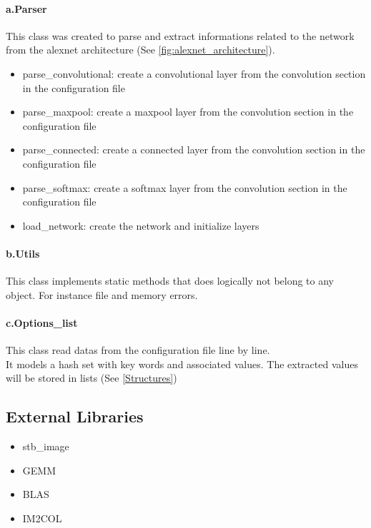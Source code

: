 \documentclass[parskip=full]{scrartcl}
\newcommand\tab[1][1cm]{\hspace*{#1}}
\begin{document}
		\paragraph{a.Parser} \label{Parser}
		\tab This class was created to parse and extract informations related to the network from the alexnet architecture (See \ref{fig:alexnet_architecture}).
		\begin{itemize}
			\item parse\_convolutional: create a convolutional layer from the convolution section in the configuration file
			\item parse\_maxpool: create a maxpool layer from the convolution section in the configuration file
			\item parse\_connected: create a connected layer from the convolution section in the configuration file
			\item parse\_softmax: create a softmax layer from the convolution section in the configuration file
			\item load\_network: create the network and initialize layers
		\end{itemize}
		
		\paragraph{b.Utils}
		\tab This class implements static methods that does logically not belong to any object. For instance file and memory errors. 
		
		\paragraph{c.Options\_list}
		\tab This class read datas from the configuration file line by line.\\
		It models a hash set with key words and associated values. The extracted values will be stored in lists (See \ref{Structures})
		
	\subsection {External Libraries} \label{External Libraries}
		\begin{itemize}
			\item stb\_image
			\item GEMM
			\item BLAS
			\item IM2COL
		\end{itemize}
		
\end{document}
